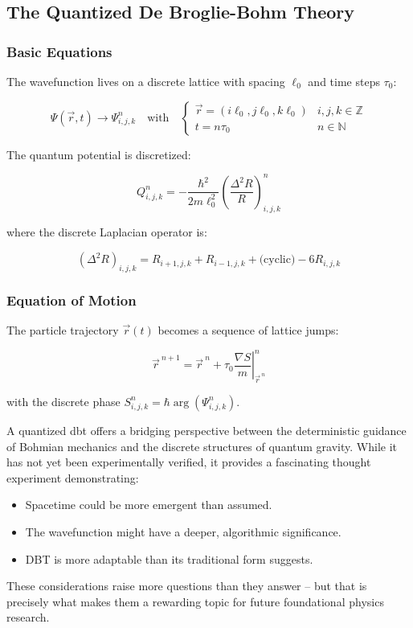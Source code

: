\subsection{The Quantized De Broglie-Bohm Theory}  
\label{sec:discrete-dbb}  

\subsubsection{Basic Equations}  
The wavefunction lives on a discrete lattice with spacing $\ell_0$ and time steps $\tau_0$:  

\begin{equation}  
\Psi(\vec{r}, t) \rightarrow \Psi_{i,j,k}^n \quad \text{with} \quad  
\begin{cases}  
\vec{r} = (i\ell_0, j\ell_0, k\ell_0) & i,j,k \in \mathbb{Z} \\  
t = n \tau_0 & n \in \mathbb{N}  
\end{cases}  
\end{equation}  

The quantum potential is discretized:  

\begin{equation}  
Q_{i,j,k}^n = -\frac{\hbar^2}{2m\ell_0^2} \left( \frac{\Delta^2 R}{R} \right)_{i,j,k}^n  
\end{equation}  

where the discrete Laplacian operator is:  

\begin{equation}  
(\Delta^2 R)_{i,j,k} = R_{i+1,j,k} + R_{i-1,j,k} + \text{(cyclic)} - 6R_{i,j,k}  
\end{equation}  

\subsubsection{Equation of Motion}  
The particle trajectory $\vec{r}(t)$ becomes a sequence of lattice jumps:  

\begin{equation}  
\vec{r}^{~n+1} = \vec{r}^{~n} + \tau_0 \left. \frac{\nabla S}{m} \right|_{\vec{r}^{~n}}^n  
\end{equation}  

with the discrete phase $S_{i,j,k}^n = \hbar \arg(\Psi_{i,j,k}^n)$.  

A quantized \gls{dbt} offers a bridging perspective between the deterministic guidance of Bohmian mechanics and the discrete structures of  
quantum gravity. While it has not yet been experimentally verified, it provides a fascinating thought experiment demonstrating:  
\begin{itemize}  
    \item Spacetime could be more emergent than assumed.  
    \item The wavefunction might have a deeper, algorithmic significance.  
    \item DBT is more adaptable than its traditional form suggests.  
\end{itemize}  
These considerations raise more questions than they answer – but that is precisely what makes them a rewarding topic for future foundational physics research.  

